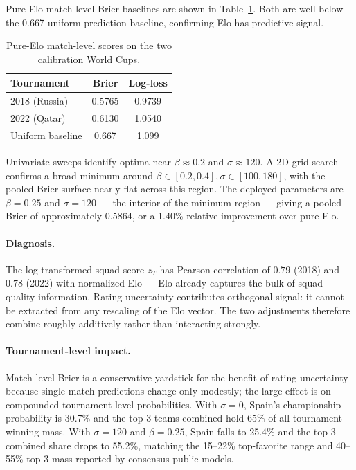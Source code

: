 \documentclass[11pt]{article}
\begin{document}
Pure-Elo match-level Brier baselines are shown in Table~\ref{tab:brier_baseline}. Both are well below the 0.667 uniform-prediction baseline, confirming Elo has predictive signal.

\begin{table}[h]
\centering
\begin{tabular}{@{}lcc@{}}
\toprule
Tournament & Brier & Log-loss \\
\midrule
2018 (Russia) & 0.5765 & 0.9739 \\
2022 (Qatar)  & 0.6130 & 1.0540 \\
\midrule
Uniform baseline & 0.667 & 1.099 \\
\bottomrule
\end{tabular}
\caption{Pure-Elo match-level scores on the two calibration World Cups.}
\label{tab:brier_baseline}
\end{table}

Univariate sweeps identify optima near $\beta \approx 0.2$ and $\sigma \approx 120$. A 2D grid search confirms a broad minimum around $\beta \in [0.2, 0.4], \sigma \in [100, 180]$, with the pooled Brier surface nearly flat across this region. The deployed parameters are $\beta = 0.25$ and $\sigma = 120$ --- the interior of the minimum region --- giving a pooled Brier of approximately 0.5864, or a 1.40\% relative improvement over pure Elo.

\paragraph{Diagnosis.} The log-transformed squad score $z_T$ has Pearson correlation of $0.79$ (2018) and $0.78$ (2022) with normalized Elo --- Elo already captures the bulk of squad-quality information. Rating uncertainty contributes orthogonal signal: it cannot be extracted from any rescaling of the Elo vector. The two adjustments therefore combine roughly additively rather than interacting strongly.

\paragraph{Tournament-level impact.} Match-level Brier is a conservative yardstick for the benefit of rating uncertainty because single-match predictions change only modestly; the large effect is on compounded tournament-level probabilities. With $\sigma = 0$, Spain's championship probability is 30.7\% and the top-3 teams combined hold 65\% of all tournament-winning mass. With $\sigma = 120$ and $\beta = 0.25$, Spain falls to 25.4\% and the top-3 combined share drops to 55.2\%, matching the 15--22\% top-favorite range and 40--55\% top-3 mass reported by consensus public models.
\end{document}
